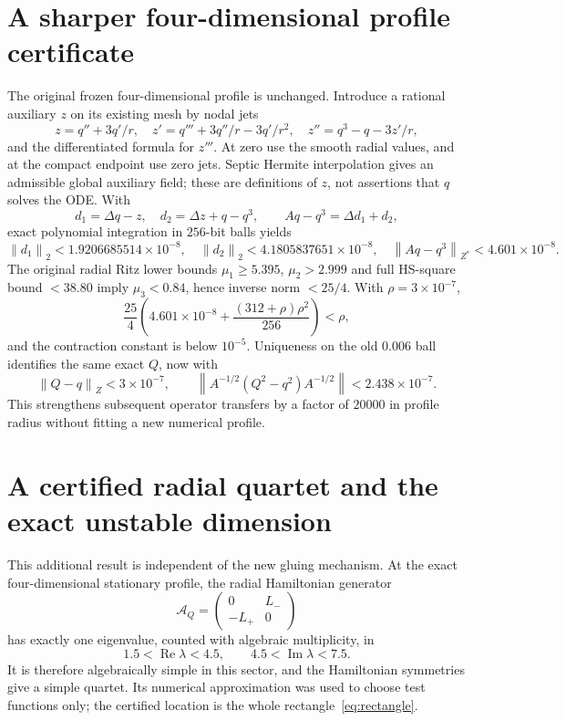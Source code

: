 \documentclass[11pt,a4paper]{article}
\theoremstyle{remark}\newtheorem{remark}[theorem]{Remark}
\newcommand{\norm}[1]{\left\|#1\right\|}
\newcommand{\Rea}{\operatorname{Re}}\newcommand{\Ima}{\operatorname{Im}}
\begin{document}
\section{A sharper four-dimensional profile certificate}
The original frozen four-dimensional profile is unchanged. Introduce a rational auxiliary $z$ on its existing mesh by nodal jets
\[
 z=q''+3q'/r,\quad z'=q'''+3q''/r-3q'/r^2,
 \quad z''=q^3-q-3z'/r,
\]
and the differentiated formula for $z'''$. At zero use the smooth radial values, and at the compact endpoint use zero jets. Septic Hermite interpolation gives an admissible global auxiliary field; these are definitions of $z$, not assertions that $q$ solves the ODE. With
\[
 d_1=\Delta q-z,\quad d_2=\Delta z+q-q^3,
 \qquad Aq-q^3=\Delta d_1+d_2,
\]
exact polynomial integration in $256$-bit balls yields
\[
 \norm{d_1}_2<1.9206685514\times10^{-8},\quad
 \norm{d_2}_2<4.1805837651\times10^{-8},\quad
 \norm{Aq-q^3}_{Z^*}<4.601\times10^{-8}.
\]
The original radial Ritz lower bounds $\mu_1\ge5.395$, $\mu_2>2.999$ and full HS-square bound $<38.80$ imply $\mu_3<0.84$, hence inverse norm $<25/4$. With $\rho=3\times10^{-7}$,
\[
 \frac{25}{4}\left(4.601\times10^{-8}+
          \frac{(312+\rho)\rho^2}{256}\right)<\rho,
\]
and the contraction constant is below $10^{-5}$. Uniqueness on the old $0.006$ ball identifies the same exact $Q$, now with
\begin{equation}\label{eq:rho4}
 \norm{Q-q}_Z<3\times10^{-7},\qquad
 \norm{A^{-1/2}(Q^2-q^2)A^{-1/2}}<2.438\times10^{-7}.
\end{equation}
This strengthens subsequent operator transfers by a factor of $20000$ in profile radius without fitting a new numerical profile.

\section{A certified radial quartet and the exact unstable dimension}\label{sec:quartet}
This additional result is independent of the new gluing mechanism. At the exact four-dimensional stationary profile, the radial Hamiltonian generator
\[
 \mathcal A_Q=\begin{pmatrix}0&L_-\\-L_+&0\end{pmatrix}
\]
has exactly one eigenvalue, counted with algebraic multiplicity, in
\begin{equation}\label{eq:rectangle}
 1.5<\Rea\lambda<4.5,\qquad4.5<\Ima\lambda<7.5.
\end{equation}
It is therefore algebraically simple in this sector, and the Hamiltonian symmetries give a simple quartet. Its numerical approximation was used to choose test functions only; the certified location is the whole rectangle~\eqref{eq:rectangle}.
\end{document}
